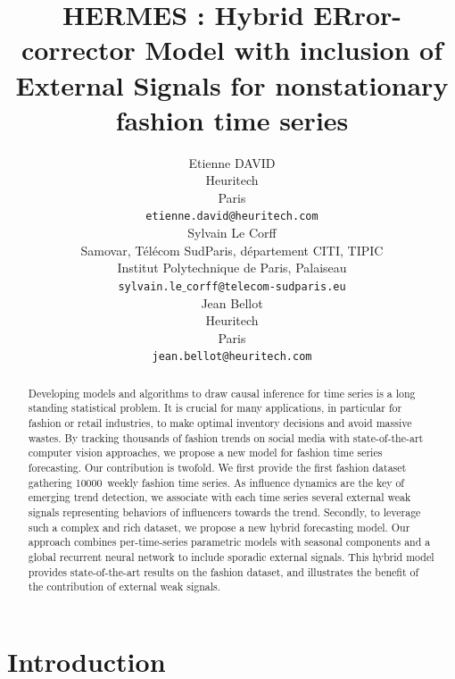 \documentclass{article} %
\title{HERMES : Hybrid ERror-corrector Model with inclusion of External Signals for nonstationary fashion time series}
\author{Etienne DAVID \\
Heuritech \\
Paris \\
\texttt{etienne.david@heuritech.com} \\
\And
Sylvain Le Corff \\
Samovar, T\'el\'ecom SudParis, d\'epartement CITI, TIPIC \\
Institut Polytechnique de Paris, Palaiseau \\
\texttt{sylvain.le$\_$corff@telecom-sudparis.eu} \\
\And 
Jean Bellot \\
Heuritech \\
Paris \\
\texttt{jean.bellot@heuritech.com} \\
}
\newcommand{\numberts}{10000}
\begin{document}
\maketitle

\begin{abstract}
Developing models and algorithms to draw causal inference for time series is a long standing statistical problem. It is crucial for many applications, in particular for fashion or retail industries, to make optimal inventory decisions and avoid massive wastes. By tracking thousands of fashion trends on social media with state-of-the-art computer vision approaches, we propose a new model for fashion time series forecasting. Our contribution is  twofold. We first provide the first fashion dataset gathering \numberts\ weekly fashion time series. As influence dynamics are the key of emerging trend detection, we associate with each time series several external weak signals representing behaviors of influencers towards the trend. Secondly, to leverage such a complex and rich dataset, we propose a new hybrid forecasting model. Our approach combines per-time-series parametric models with seasonal components and a global recurrent neural network to include sporadic external signals. This hybrid model provides state-of-the-art results on the fashion dataset, and illustrates the benefit of the contribution of external weak signals.
\end{abstract}

\section{Introduction}
\end{document}
